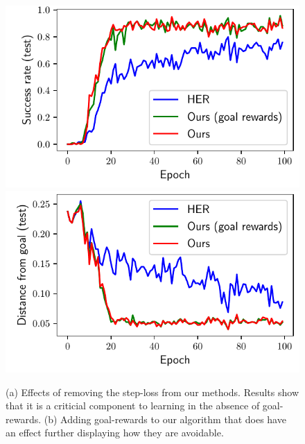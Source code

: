 \begin{figure}
\begin{minipage}[b]{0.5\linewidth}
    \includegraphics[width=\frac\columnwidth]{media/res/ablate-ours-with-goal-reward/FetchPickAndPlace-dqstepoch-test/success_rate.pdf}%
    \includegraphics[width=\frac\columnwidth]{media/res/ablate-ours-with-goal-reward/FetchPickAndPlace-dqstepoch-test/ag_g_dist.pdf}\\
    \label{fig:with-and-without-step-loss-b}
  \end{minipage}
  \caption{
      (a) Effects of removing the step-loss from our methods. Results
      show that it is a criticial component to learning in the absence
      of goal-rewards.  
      (b) Adding goal-rewards to our algorithm that does have an effect
      further displaying how they are avoidable. 
    }
  \label{fig:with-and-without-step-loss}%
\end{figure}%
% 

